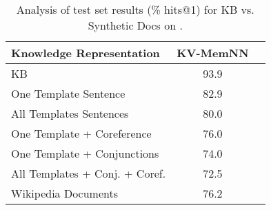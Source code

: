 \begin{table}[t!]
	\begin{center}
          \begin{small}
  	\begin{tabular}{l|c|c|}
      	    Knowledge Representation   &  KV-MemNN  \\
     	    \hline
       	KB                               &   93.9    \\
      	One Template Sentence            &   82.9    \\
       	All Templates Sentences          &   80.0        \\
       	One Template + Coreference      &   76.0         \\
       	One Template + Conjunctions       &   74.0        \\
       	All Templates + Conj. + Coref.   &   72.5       \\
       	Wikipedia Documents              &    76.2   \\
  	 \end{tabular}
    	\caption{
	\label{tab:templateres}
              { Analysis of test set results (\% hits@1) for KB vs. Synthetic Docs on \WikiMovies.}}
          \end{small}
  	\end{center}
\end{table}



